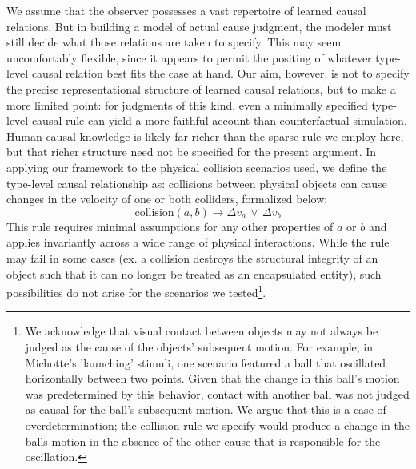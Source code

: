 \documentclass[10pt,letterpaper]{article}
\begin{document}
We assume that the observer possesses a vast repertoire of learned causal relations. But in building a model of actual cause judgment, the modeler must still decide what those relations are taken to specify. This may seem uncomfortably flexible, since it appears to permit the positing of whatever type-level causal relation best fits the case at hand. Our aim, however, is not to specify the precise representational structure of learned causal relations, but to make a more limited point: for judgments of this kind, even a minimally specified type-level causal rule can yield a more faithful account than counterfactual simulation. Human causal knowledge is likely far richer than the sparse rule we employ here, but that richer structure need not be specified for the present argument. In applying our framework to the physical collision scenarios used, we define the type-level causal relationship as: collisions between physical objects can cause changes in the velocity of one or both colliders, formalized below: 
\[\mathrm{collision}(a,b) \rightarrow \Delta v_a \,\vee\, \Delta v_b\] This rule requires minimal assumptions for any other properties of $a$ or $b$ and applies invariantly across a wide range of physical interactions. While the rule may fail in some cases (ex. a collision destroys the structural integrity of an object such that it can no longer be treated as an encapsulated entity), such possibilities do not arise for the scenarios we tested\footnote{We acknowledge that visual contact between objects may not always be judged as the cause of the objects' subsequent motion. For example, in Michotte's 'launching' stimuli, one scenario featured a ball that oscillated horizontally between two points. Given that the change in this ball's motion was predetermined by this behavior, contact with another ball was not judged as causal for the ball's subsequent motion. We argue that this is a case of overdetermination; the collision rule we specify would produce a change in the balls motion in the absence of the other cause that is responsible for the oscillation.}.
\end{document}
